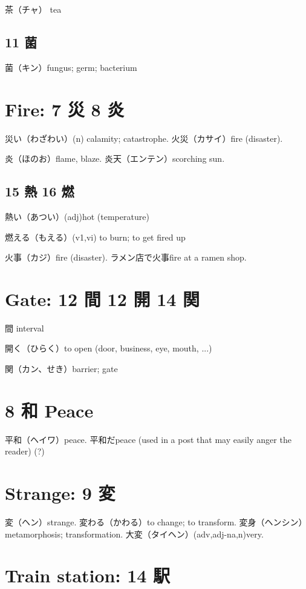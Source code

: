 茶（チャ） tea

\subsection{11 菌}

菌（キン）fungus; germ; bacterium

\section{Fire: 7 災 8 炎}

災い（わざわい）(n) calamity; catastrophe.
火災（カサイ）fire (disaster).

炎（ほのお）flame, blaze.
炎天（エンテン）scorching sun.

\subsection{15 熱 16 燃}

熱い（あつい）(adj)hot (temperature)

燃える（もえる）(v1,vi) to burn; to get fired up

火事（カジ）fire (disaster).
ラメン店で火事fire at a ramen shop.

\section{Gate: 12 間 12 開 14 関}

間 interval

開く（ひらく）to open (door, business, eye, mouth, ...)

関（カン、せき）barrier; gate

\section{8 和 Peace}

平和（ヘイワ）peace.
平和だpeace (used in a post that may easily anger the reader) (?)

\section{Strange: 9 変}

変（ヘン）strange.
変わる（かわる）to change; to transform.
変身（ヘンシン）metamorphosis; transformation.
大変（タイヘン）(adv,adj-na,n)very.

\section{Train station: 14 駅}

